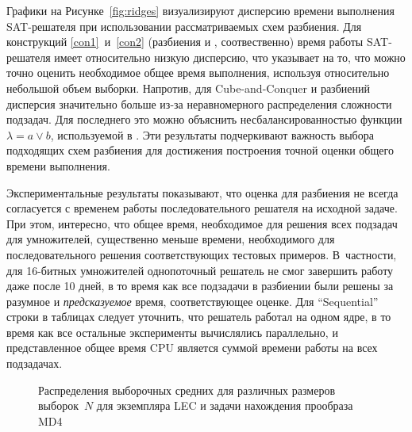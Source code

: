 Графики на Рисунке~\ref{fig:ridges} визуализируют дисперсию времени выполнения SAT-решателя при использовании рассматриваемых схем разбиения.
Для конструкций \ref{con1}~и~\ref{con2} (разбиения  и , соотвественно) время работы SAT-решателя имеет относительно низкую дисперсию, что указывает на то, что можно точно оценить необходимое общее время выполнения, используя относительно небольшой объем выборки.
Напротив, для Cube-and-Conquer и разбиений  дисперсия значительно больше из-за неравномерного распределения сложности подзадач.
Для последнего это можно объяснить несбалансированностью функции $\lambda = a \lor b$, используемой в .
Эти результаты подчеркивают важность выбора подходящих схем разбиения для достижения построения точной оценки общего времени выполнения.

Экспериментальные результаты показывают, что оценка для разбиения не всегда согласуется с временем работы последовательного решателя на исходной задаче.
При этом, интересно, что общее время, необходимое для решения всех подзадач для умножителей, существенно меньше времени, необходимого для последовательного решения соответствующих тестовых примеров.
В~частности, для 16-битных умножителей однопоточный решатель не смог завершить работу даже после 10 дней, в то время как все подзадачи в разбиении были решены за разумное и \emph{предсказуемое} время, соответствующее оценке.
Для \enquote{Sequential} строки в таблицах следует уточнить, что решатель работал на одном ядре, в то время как все остальные эксперименты вычислялись параллельно, и представленное общее время CPU является суммой времени работы на всех подзадачах.

\begin{figure*}[!htb]
    \centering
    \hfill
    \hfill
    \hfill
    \caption{Распределения выборочных средних для различных размеров выборок~$N$ для экземпляра LEC  и задачи нахождения прообраза MD4 }
    \label{fig:min-max-CvK-16-kissat}
\end{figure*}


